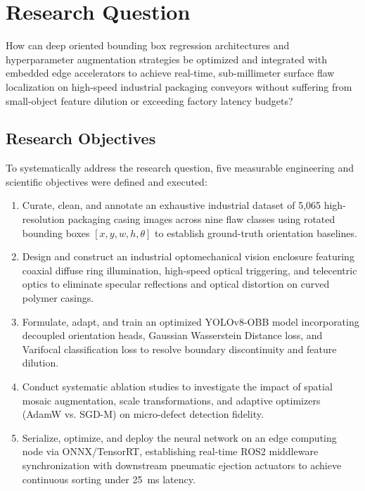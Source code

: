\section{Research Question}
\label{sec:rq}

How can deep oriented bounding box regression architectures and hyperparameter augmentation strategies be optimized and integrated with embedded edge accelerators to achieve real-time, sub-millimeter surface flaw localization on high-speed industrial packaging conveyors without suffering from small-object feature dilution or exceeding factory latency budgets?

\subsection{Research Objectives}
\label{subsec:objectives}

To systematically address the research question, five measurable engineering and scientific objectives were defined and executed:

\begin{enumerate}
\item Curate, clean, and annotate an exhaustive industrial dataset of 5,065 high-resolution packaging casing images across nine flaw classes using rotated bounding boxes $[x, y, w, h, \theta]$ to establish ground-truth orientation baselines.
\item Design and construct an industrial optomechanical vision enclosure featuring coaxial diffuse ring illumination, high-speed optical triggering, and telecentric optics to eliminate specular reflections and optical distortion on curved polymer casings.
\item Formulate, adapt, and train an optimized YOLOv8-OBB model incorporating decoupled orientation heads, Gaussian Wasserstein Distance loss, and Varifocal classification loss to resolve boundary discontinuity and feature dilution.
\item Conduct systematic ablation studies to investigate the impact of spatial mosaic augmentation, scale transformations, and adaptive optimizers (AdamW vs. SGD-M) on micro-defect detection fidelity.
\item Serialize, optimize, and deploy the neural network on an edge computing node via ONNX/TensorRT, establishing real-time ROS2 middleware synchronization with downstream pneumatic ejection actuators to achieve continuous sorting under 25~ms latency.
\end{enumerate}

